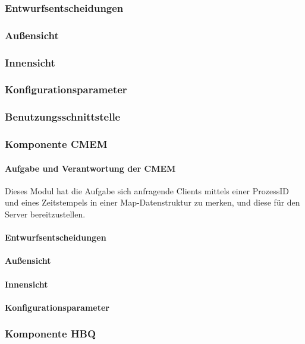 \documentclass{article}
\begin{document}
		\subsubsection{Entwurfsentscheidungen}
		\subsubsection{Außensicht}
		\subsubsection{Innensicht}
		\subsubsection{Konfigurationsparameter}
		\subsubsection{Benutzungsschnittstelle}
		
		\subsubsection{Komponente CMEM}
			\paragraph{Aufgabe und Verantwortung der CMEM}
				Dieses Modul hat die Aufgabe sich anfragende Clients mittels einer ProzessID und eines Zeitstempels in einer Map-Datenstruktur zu merken, und diese für den Server bereitzustellen.
			\paragraph{Entwurfsentscheidungen}
			\paragraph{Außensicht}
			\paragraph{Innensicht}
			\paragraph{Konfigurationsparameter}
			
			
		\subsubsection{Komponente HBQ}
\end{document}
